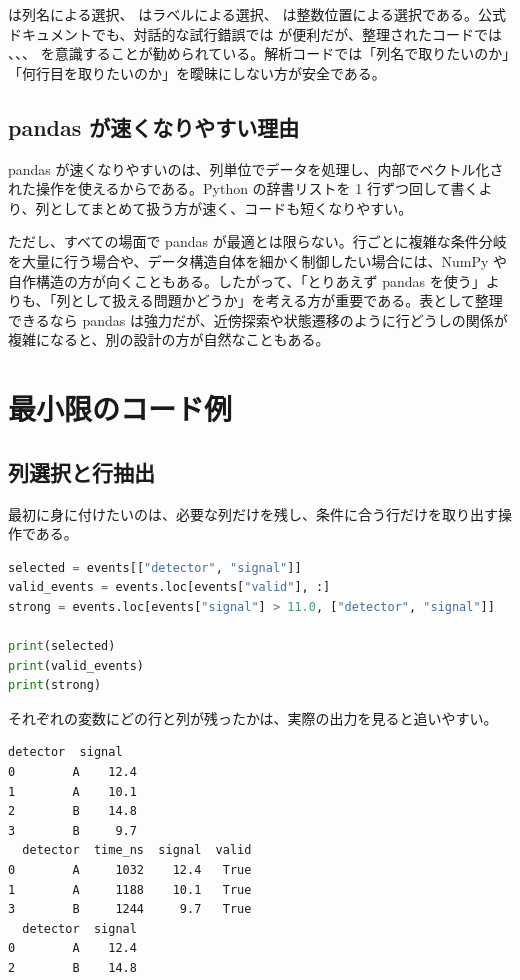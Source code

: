  は列名による選択、 はラベルによる選択、 は整数位置による選択である。公式ドキュメントでも、対話的な試行錯誤では \code{[]} が便利だが、整理されたコードでは 、、、 を意識することが勧められている。解析コードでは「列名で取りたいのか」「何行目を取りたいのか」を曖昧にしない方が安全である。

\subsection{pandas が速くなりやすい理由}

pandas が速くなりやすいのは、列単位でデータを処理し、内部でベクトル化された操作を使えるからである。Python の辞書リストを 1 行ずつ回して書くより、列としてまとめて扱う方が速く、コードも短くなりやすい。

ただし、すべての場面で pandas が最適とは限らない。行ごとに複雑な条件分岐を大量に行う場合や、データ構造自体を細かく制御したい場合には、NumPy や自作構造の方が向くこともある。したがって、「とりあえず pandas を使う」よりも、「列として扱える問題かどうか」を考える方が重要である。表として整理できるなら pandas は強力だが、近傍探索や状態遷移のように行どうしの関係が複雑になると、別の設計の方が自然なこともある。

\section{最小限のコード例}

\subsection{列選択と行抽出}

最初に身に付けたいのは、必要な列だけを残し、条件に合う行だけを取り出す操作である。

\begin{lstlisting}[language=Python]
selected = events[["detector", "signal"]]
valid_events = events.loc[events["valid"], :]
strong = events.loc[events["signal"] > 11.0, ["detector", "signal"]]

print(selected)
print(valid_events)
print(strong)
\end{lstlisting}

それぞれの変数にどの行と列が残ったかは、実際の出力を見ると追いやすい。

\begin{lstlisting}[numbers=none, xleftmargin=2\zw]
  detector  signal
0        A    12.4
1        A    10.1
2        B    14.8
3        B     9.7
  detector  time_ns  signal  valid
0        A     1032    12.4   True
1        A     1188    10.1   True
3        B     1244     9.7   True
  detector  signal
0        A    12.4
2        B    14.8
\end{lstlisting}

